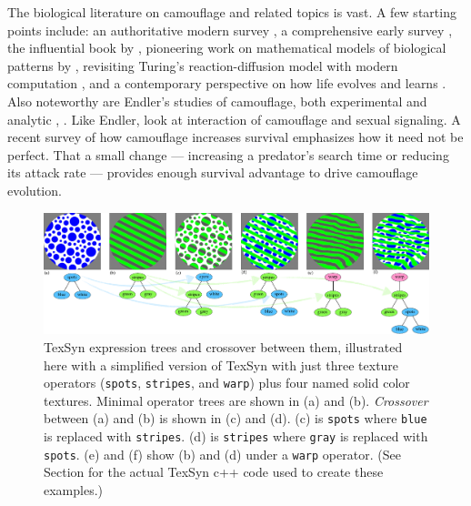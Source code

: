 \documentclass[letterpaper]{article}
\newcommand{\texsyn}[0]{TexSyn}
\newcommand{\stt}[1]{{\small \texttt{#1}}}
\begin{document}
The biological literature on camouflage and related topics is vast. A few starting points include: an authoritative modern survey \citep{cuthill_camouflage_2019}, a comprehensive early survey \citep{thayer_concealing-coloration_1909}, the influential book by \citet{cott_adaptive_1940}, pioneering work on mathematical models of biological patterns by \citet{turing_chemical_1952}, revisiting Turing's reaction-diffusion model with modern computation \citep{murray_how_1988}, and a contemporary perspective on how life evolves and learns \citep{valiant_probably_2013}. Also noteworthy are Endler's studies of camouflage, both experimental \citep{endler_natural_1980} and analytic \citep{endler_predators_1978}, \citep{endler_framework_2012}. Like Endler, \citet{brichard_natural_2023} look at interaction of camouflage and sexual signaling. A recent survey of how camouflage increases survival \citep{de_alcantara_viana_predator_2022} emphasizes how it need not be perfect. That a small change — increasing a predator's search time or reducing its attack rate — provides enough survival advantage to drive camouflage evolution.
\par


\begin{figure}[t]
    \includegraphics[width=\textwidth]{texsyn_overview.pdf}
    \caption{\texsyn{} expression trees and crossover between them, illustrated here with a simplified version of \texsyn{} with just three texture operators (\stt{spots}, \stt{stripes}, and \stt{warp}) plus four named solid color textures. Minimal operator trees are shown in (a) and (b). \textit{Crossover} between (a) and (b) is shown in (c) and (d). (c) is \stt{spots} where \stt{blue} is replaced with \stt{stripes}. (d) is \stt{stripes} where \stt{gray} is replaced with \stt{spots}. (e) and (f) show (b) and (d) under a \texttt{warp} operator. (See Section  for the actual \texsyn{} c++ code used to create these examples.)}
    \label{fig:TexSyn_overview}
\end{figure}
\end{document}
